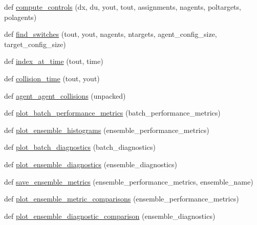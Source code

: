 \begin{DoxyCompactItemize}
\item 
def \mbox{\hyperlink{namespace_d_o_t__assignment_1_1post__process_af8fe6cab30c1341f46b034bb6ba1b0f7}{compute\+\_\+controls}} (dx, du, yout, tout, assignments, nagents, poltargets, polagents)
\item 
def \mbox{\hyperlink{namespace_d_o_t__assignment_1_1post__process_a272aa83b0082e05aa34510531ee99d03}{find\+\_\+switches}} (tout, yout, nagents, ntargets, agent\+\_\+config\+\_\+size, target\+\_\+config\+\_\+size)
\item 
def \mbox{\hyperlink{namespace_d_o_t__assignment_1_1post__process_a37b9bc57ea7c5c977fb3c3e30660e467}{index\+\_\+at\+\_\+time}} (tout, time)
\item 
def \mbox{\hyperlink{namespace_d_o_t__assignment_1_1post__process_a236c6a12b67e46887df627b9eb3b7238}{collision\+\_\+time}} (tout, yout)
\item 
def \mbox{\hyperlink{namespace_d_o_t__assignment_1_1post__process_a288aa587d8918d98b8bda5af6ace1dbe}{agent\+\_\+agent\+\_\+collisions}} (unpacked)
\item 
def \mbox{\hyperlink{namespace_d_o_t__assignment_1_1post__process_a132b56854e07708185775fca4cc1bcd3}{plot\+\_\+batch\+\_\+performance\+\_\+metrics}} (batch\+\_\+performance\+\_\+metrics)
\item 
def \mbox{\hyperlink{namespace_d_o_t__assignment_1_1post__process_a1e8346306e97b9ab19b9bd682c3ddcd7}{plot\+\_\+ensemble\+\_\+histograms}} (ensemble\+\_\+performance\+\_\+metrics)
\item 
def \mbox{\hyperlink{namespace_d_o_t__assignment_1_1post__process_a9ef8af894bef78b4bd967a0e0298b141}{plot\+\_\+batch\+\_\+diagnostics}} (batch\+\_\+diagnostics)
\item 
def \mbox{\hyperlink{namespace_d_o_t__assignment_1_1post__process_acd3fd5ffd64792ddf60d6b5f258dd422}{plot\+\_\+ensemble\+\_\+diagnostics}} (ensemble\+\_\+diagnostics)
\item 
def \mbox{\hyperlink{namespace_d_o_t__assignment_1_1post__process_afaad9e32ef7dcf3926653b2b0c076781}{save\+\_\+ensemble\+\_\+metrics}} (ensemble\+\_\+performance\+\_\+metrics, ensemble\+\_\+name)
\item 
def \mbox{\hyperlink{namespace_d_o_t__assignment_1_1post__process_a00d9169a5cfaaade92ec1bfdb2483216}{plot\+\_\+ensemble\+\_\+metric\+\_\+comparisons}} (ensemble\+\_\+performance\+\_\+metrics)
\item 
def \mbox{\hyperlink{namespace_d_o_t__assignment_1_1post__process_ac7d20cd04bb73f5a144e1a84f7aae0a1}{plot\+\_\+ensemble\+\_\+diagnostic\+\_\+comparison}} (ensemble\+\_\+diagnostics)
\end{DoxyCompactItemize}



